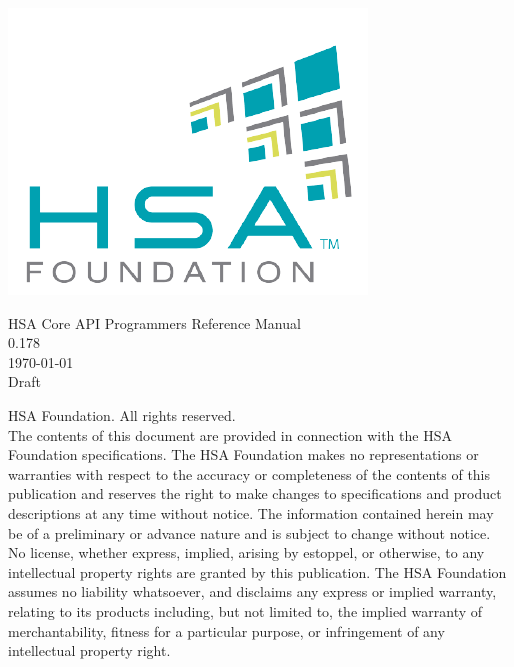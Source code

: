 \documentclass{book}
\begin{document}
\hypersetup{pageanchor=false,citecolor=blue}
\begin{titlepage}
\includegraphics[width=.5\textwidth]{fig/foundation.png}
\vspace*{7cm}
\begin{center}
{\Large HSA Core API Programmers Reference Manual\\[1ex]\large
0.178}\\
\vspace*{1cm}
\vspace*{0.5cm}
{\small \today}\\
\vspace*{0.5cm}
{\small Draft}\\
\end{center}
\end{titlepage}
\thispagestyle{empty}
{ HSA Foundation. All rights reserved.\\}
The contents of this document are provided in connection with the
HSA Foundation specifications. The HSA Foundation makes no
representations or warranties with respect to the accuracy or
completeness of the contents of this publication and reserves the
right to make changes to specifications and product descriptions at
any time without notice. The information contained herein may be of
a preliminary or advance nature and is subject to change without
notice. No license, whether express, implied, arising by estoppel,
or otherwise, to any intellectual property rights are granted by
this publication. The HSA Foundation assumes no liability
whatsoever, and disclaims any express or implied warranty, relating
to its products including, but not limited to, the implied warranty
of merchantability, fitness for a particular purpose, or
infringement of any intellectual property right.
\clearpage
{}
\tableofcontents
{}
\clearpage

\setcounter{page}{1}
\end{document}
